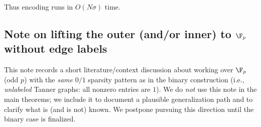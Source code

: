 Thus encoding runs in $O(N\sigma)$ time.














\subsection{Note on lifting the outer (and/or inner) to $\F_p$ without edge labels}
\label{subsec:note-fp-unlabeled}

This note records a short literature/context discussion about working over $\F_p$ (odd $p$) with the \emph{same}
$0/1$ sparsity pattern as in the binary construction (i.e., \emph{unlabeled} Tanner graphs: all nonzero entries are $1$).
We do \emph{not} use this note in the main theorems; we include it to document a plausible generalization path and to
clarify what is (and is not) known. We postpone pursuing this direction until the binary case is finalized.

